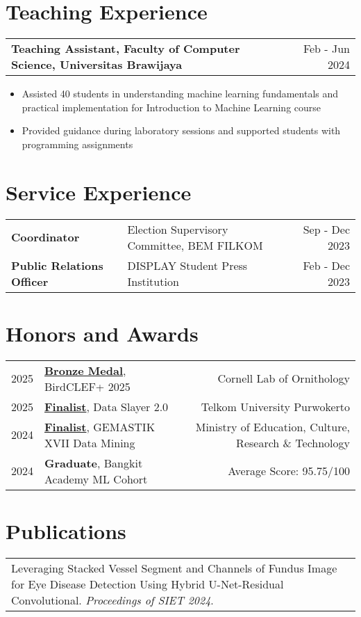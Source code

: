 \documentclass[a4paper,10pt]{article}
\makeatletter
\newenvironment{joblong}[2]
    {
    \begin{tabularx}{\linewidth}{@{}l X r@{}}
    \textbf{#1} & \hfill & #2 \\[2pt]
    \end{tabularx}
    \begin{minipage}[t]{\linewidth}
    \begin{itemize}[nosep,after=\strut, leftmargin=1em, itemsep=1pt, label=\textbullet]
    }
    {
    \end{itemize}
    \end{minipage}    
    }
\makeatother
\begin{document}
\section{Teaching Experience}

\begin{joblong}{Teaching Assistant, Faculty of Computer Science, Universitas Brawijaya}{Feb - Jun 2024}
\item Assisted 40 students in understanding machine learning fundamentals and practical implementation for Introduction to Machine Learning course
\item Provided guidance during laboratory sessions and supported students with programming assignments
\end{joblong}

\section{Service Experience}
\begin{tabularx}{\linewidth}{@{}l X r@{}}
\textbf{Coordinator} & Election Supervisory Committee, BEM FILKOM & Sep - Dec 2023 \\
\textbf{Public Relations Officer} & DISPLAY Student Press Institution & Feb - Dec 2023 \\
\end{tabularx}

\section{Honors and Awards}
\begin{tabularx}{\linewidth}{@{}l X r@{}}
2025 & \href{https://drive.google.com/file/d/1HlHqBQiY5aCp8P5qI-VP7Qo11Sv0Op5J/view?usp=drive_link}{\textbf{Bronze Medal}}, BirdCLEF+ 2025 & Cornell Lab of Ornithology \\
2025 & \href{https://drive.google.com/file/d/1C0Lqpp6gYZGfwgYtDjUa75PJxaKPobHK/view?usp=drive_link}{\textbf{Finalist}}, Data Slayer 2.0 & Telkom University Purwokerto \\
2024 & \href{https://drive.google.com/file/d/1IgvW4PnoxvhXLq-yllY7VhY5LpvlcQp-/view?usp=drive_link}{\textbf{Finalist}}, GEMASTIK XVII Data Mining & Ministry of Education, Culture, Research \& Technology \\
2024 & \textbf{Graduate}, Bangkit Academy ML Cohort & Average Score: 95.75/100 \\
\end{tabularx}

\section{Publications}
\begin{tabularx}{\linewidth}{@{}X@{}}
Leveraging Stacked Vessel Segment and Channels of Fundus Image for Eye Disease Detection Using Hybrid U-Net-Residual Convolutional. \textit{Proceedings of SIET 2024}. \\
\end{tabularx}
\end{document}
